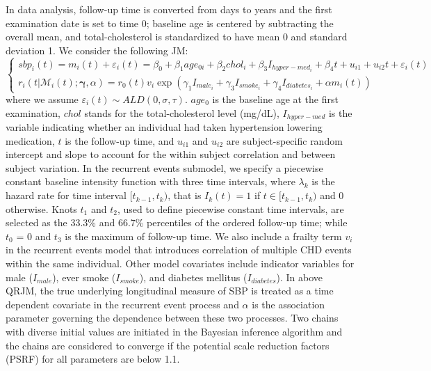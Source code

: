 In data analysis, follow-up time is converted from days to years and the first examination date is set to time 0; baseline age is centered by subtracting the overall mean, and total-cholesterol is standardized to have mean 0 and standard deviation 1. We consider the following JM:
\small{
\begin{equation*}\label{eqn:p3data_joint}
\left\{
\begin{array}{l}
sbp_{i}(t) = m_{i}(t) + \varepsilon_{i}(t) = \beta_0 + \beta_1 age_{0i} + \beta_2 chol_i + \beta_3 I_{hyper-med_i}+ \beta_4 t + {u}_{i1} + u_{i2} t + \varepsilon_{i}(t)\\
r_i(t|\mathcal{M}_{i}(t);  \boldsymbol{\gamma}, \alpha) = r_{0}(t)v_i\exp(\gamma_1 I_{male_i} + \gamma_3 I_{smoke_i} + \gamma_4I_{diabetes_i} + \alpha m_i(t))
\end{array}
\right.
\end{equation*}
}
where we assume  $\varepsilon_{i}(t)\sim ALD(0, \sigma, \tau)$. $age_0$ is the baseline age at the first examination, $chol$ stands for the total-cholesterol level (mg/dL), $I_{hyper-med}$ is the variable indicating whether an individual had taken hypertension lowering medication, $t$ is the follow-up time, and $u_{i1}$ and $u_{i2}$ are subject-specific random intercept and slope to account for the within subject correlation and between subject variation. In the recurrent events submodel, we specify a piecewise constant baseline intensity function with three time intervals, where $\lambda_k$ is the hazard rate for time interval $[t_{k-1}, t_{k})$, that is $I_k(t)=1$ if $t\in[t_{k-1}, t_{k})$ and 0 otherwise. Knots $t_1$ and $t_2$, used to define piecewise constant time intervals, are selected as the 33.3\% and 66.7\% percentiles of the ordered follow-up time; while $t_0$ = 0 and $t_3$ is the maximum of follow-up time. We also include a frailty term $v_i$ in the recurrent events model that introduces correlation of multiple CHD events within the same individual. Other model covariates include indicator variables for male ($I_{male}$), ever smoke ($I_{smoke}$), and diabetes mellitus ($I_{diabetes}$). In above QRJM, the true underlying longitudinal measure of SBP is treated as a time dependent covariate in the recurrent event process and $\alpha$ is the association parameter governing the dependence between these two processes. Two chains with diverse initial values are initiated in the Bayesian inference algorithm and the chains are considered to converge if the potential scale reduction factors (PSRF) for all parameters are below 1.1.

